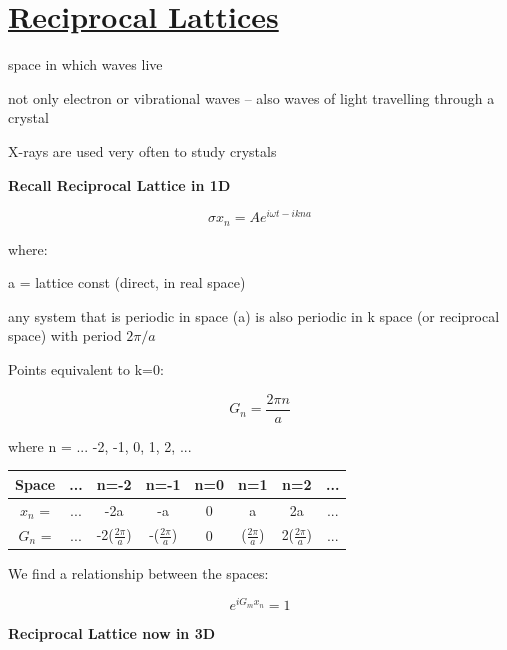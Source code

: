 \section[Reciprocal Lattices]{\hyperlink{toc}{Reciprocal Lattices}}

space in which waves live

not only electron or vibrational waves
-- also waves of light travelling through a crystal

X-rays are used very often to study crystals

\textbf{Recall Reciprocal Lattice in 1D}

\[\sigma x_n = Ae^{i\omega t - i k n a} \]

where:

a = lattice const (direct, in real space)

any system that is periodic in space (a) is also periodic in k space (or reciprocal space) with period $2\pi/a$

Points equivalent to k=0:

\[G_n = \frac{2\pi n}{a}\]

 where n = ... -2, -1, 0, 1, 2, ...
 
 \begin{center}
\begin{tabular}{|c c c c c c c c|} 
 \hline
 \textbf{Space} & ... & n=-2 & n=-1 & n=0 & n=1 & n=2 & ...  \\ [0.5ex] 
 \hline\hline
 $x_n$ =  & ... & -2a & -a & 0 & a & 2a & ... \\ 
 \hline
 $G_n$ =    & ... & -2($\frac{2\pi}{a}$) & -($\frac{2\pi}{a}$) & 0 & ($\frac{2\pi}{a}$)  & 2($\frac{2\pi}{a}$) & ... \\ [1ex] 
 \hline
\end{tabular}
\end{center}


We find a relationship between the spaces:

\begin{tcolorbox}[enhanced,attach boxed title to top center={yshift=-3mm,yshifttext=-1mm},
  colback=blue!5!white,colframe=blue!75!black,colbacktitle=red!80!black,
  title=Reciprocal-Direct Lattice Relationship,fonttitle=\bfseries,
  boxed title style={size=small,colframe=red!50!black} ]
  \begin{equation}
      e^{iG_mx_n} = 1
  \end{equation}
\end{tcolorbox}

\textbf{Reciprocal Lattice now in 3D}

